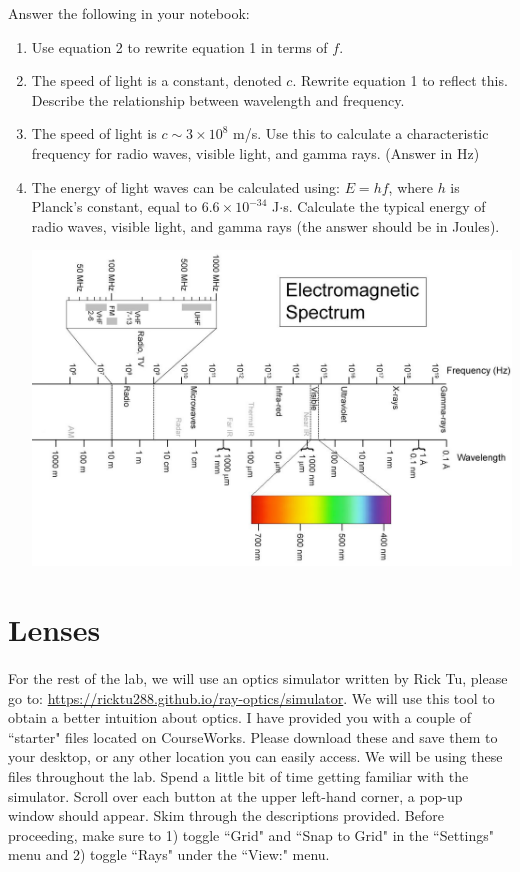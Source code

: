 \documentclass[12pt]{article}%
\begin{document}
\noindent Answer the following in your notebook:
 
\begin{enumerate}
\item Use equation 2 to rewrite equation 1 in terms of $f$.
\item The speed of light is a constant, denoted $c$.  Rewrite equation 1 to reflect this. Describe the relationship between wavelength and frequency.
\item The speed of light is $c \sim 3 \times 10^8$ m/s.  Use this to calculate a characteristic frequency for radio waves, visible light, and gamma rays. (Answer in Hz)
\item The energy of light waves can be calculated using:  $E=hf$, where $h$ is Planck's constant, equal to $6.6\times10^{-34}$ J$\cdot$s.  Calculate the typical energy of radio waves, visible light, and gamma rays (the answer should be in Joules). 

 
 
\centerline{\includegraphics[scale=0.4]{ems.jpg}}
 
\end{enumerate}
 
\section{Lenses}
\paragraph{}
For the rest of the lab, we will use an optics simulator written by Rick Tu, please go to: \url{https://ricktu288.github.io/ray-optics/simulator}. We will use this tool to obtain a better intuition about optics. I have provided you with a couple of ``starter" files located on CourseWorks. Please download these and save them to your desktop, or any other location you can easily access. We will be using these files throughout the lab. Spend a little bit of time getting familiar with the simulator. Scroll over each button at the upper left-hand corner, a pop-up window should appear. Skim through the descriptions provided. Before proceeding, make sure to 1) toggle ``Grid" and ``Snap to Grid" in the ``Settings" menu and 2) toggle ``Rays" under the ``View:" menu.
 
\end{document}
